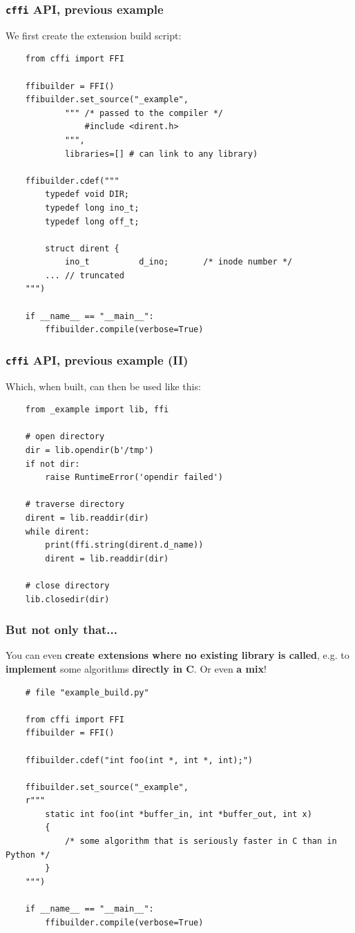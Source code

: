 \documentclass[handout]{beamer}
\begin{document}
\begin{frame}[fragile]
  \frametitle{\texttt{cffi} API, previous example}

  We first create the extension build script:

  \begin{verbatim}
    from cffi import FFI

    ffibuilder = FFI()
    ffibuilder.set_source("_example",
            """ /* passed to the compiler */
                #include <dirent.h>
            """,
            libraries=[] # can link to any library)

    ffibuilder.cdef("""
        typedef void DIR;
        typedef long ino_t;
        typedef long off_t;

        struct dirent {
            ino_t          d_ino;       /* inode number */
        ... // truncated
    """)

    if __name__ == "__main__":
        ffibuilder.compile(verbose=True)
  \end{verbatim}
\end{frame}

\begin{frame}[fragile]
  \frametitle{\texttt{cffi} API, previous example (II)}

  Which, when built, can then be used like this:

  \begin{verbatim}
    from _example import lib, ffi

    # open directory
    dir = lib.opendir(b'/tmp')
    if not dir:
        raise RuntimeError('opendir failed')

    # traverse directory
    dirent = lib.readdir(dir)
    while dirent:
        print(ffi.string(dirent.d_name))
        dirent = lib.readdir(dir)

    # close directory
    lib.closedir(dir)
  \end{verbatim}
\end{frame}

\begin{frame}[fragile]
  \frametitle{But not only that...}

  You can even \textbf{create extensions where no existing library is called},
  e.g. to \textbf{implement} some algorithms \textbf{directly in C}. Or even
  \textbf{a mix}!

  \begin{verbatim}
    # file "example_build.py"

    from cffi import FFI
    ffibuilder = FFI()

    ffibuilder.cdef("int foo(int *, int *, int);")

    ffibuilder.set_source("_example",
    r"""
        static int foo(int *buffer_in, int *buffer_out, int x)
        {
            /* some algorithm that is seriously faster in C than in Python */
        }
    """)

    if __name__ == "__main__":
        ffibuilder.compile(verbose=True)
  \end{verbatim}
\end{frame}
\end{document}
